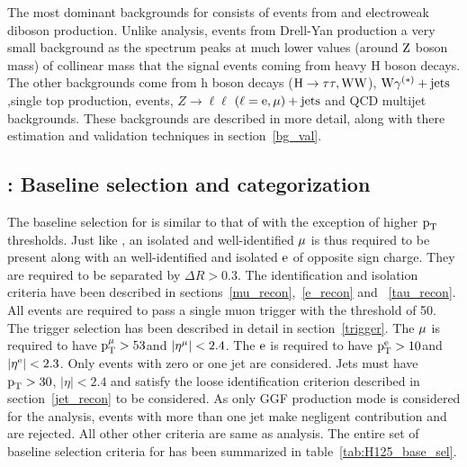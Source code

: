 The most dominant backgrounds for \Hmue consists of events from  \ttb and electroweak diboson production. Unlike \hmue analysis, \ztt events from Drell-Yan production a very small background as the \ztt spectrum peaks at much lower values (around $\text{Z}$ boson mass) of collinear mass that the signal events coming from heavy H boson decays. The other backgrounds come from h boson decays ($\text{H} \to \tau\tau,\text{W}\text{W}$), $\text{W}\gamma^{(*)}+\text{jets}$ ,single top production, \wjets events, $Z\to\ell\ell$ $(\ell = \text{e}, \mu)+\text{jets}$ and QCD multijet backgrounds. These backgrounds are described in more detail, along with there estimation and validation techniques in section~\ref{bg_val}.        

\subsection{\Hmue: Baseline selection and categorization}
\label{H_presel_cat}
The baseline selection for \Hmue is similar to that of \hmue with the exception of higher $\text{p}_\text{T}$ thresholds. Just like \hmue, an isolated and well-identified $\mu$ is thus required to be present along with an well-identified and isolated $\text{e}$ of opposite sign charge. They are required to be separated by $\Delta R > 0.3$. The identification and isolation criteria have been described in sections~\ref{mu_recon},~\ref{e_recon} and ~\ref{tau_recon}. All events are required to pass a single muon trigger with the threshold of 50\GeV. The trigger selection has been described in detail in section~\ref{trigger}. The $\mu$ is required to have $\text{p}_\text{T}^{\mu} > 53$\GeV and $|\eta^{\mu}|<2.4$. The $\text{e}$ is required to have $\text{p}_\text{T}^{\text{e}} > 10$\GeV and $|\eta^{\text{e}}|<2.3$. Only events with zero or one jet are considered. Jets  must have $\text{p}_\text{T}>30$\GeV, $|\eta| < 2.4 $ and satisfy the loose identification criterion described in section~\ref{jet_recon} to be considered. As only GGF production mode is considered for the \Hmue analysis, events with more than one jet make negligent contribution and are rejected. All other other criteria are same as \hmue analysis. The entire set of baseline selection criteria for \Hmue has been summarized in table~\ref{tab:H125_base_sel}.

